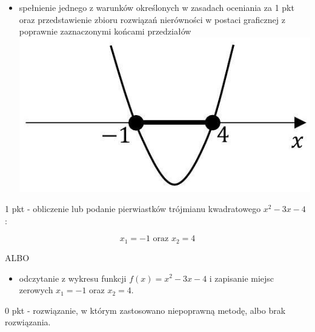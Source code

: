 \documentclass[10pt]{article}
\begin{document}
\begin{itemize}
  \item spełnienie jednego z warunków określonych w zasadach oceniania za 1 pkt oraz przedstawienie zbioru rozwiązań nierówności w postaci graficznej z poprawnie zaznaczonymi końcami przedziałów\\
\includegraphics[max width=\textwidth, center]{2025_02_07_7750073b5ff18154e9e8g-17}
\end{itemize}

1 pkt - obliczenie lub podanie pierwiastków trójmianu kwadratowego $x^{2}-3 x-4$ :

$$
x_{1}=-1 \text { oraz } x_{2}=4
$$

ALBO

\begin{itemize}
  \item odczytanie z wykresu funkcji $f(x)=x^{2}-3 x-4$ i zapisanie miejsc zerowych $x_{1}=-1$ oraz $x_{2}=4$.
\end{itemize}

0 pkt - rozwiązanie, w którym zastosowano niepoprawną metodę, albo brak rozwiązania.
\end{document}
